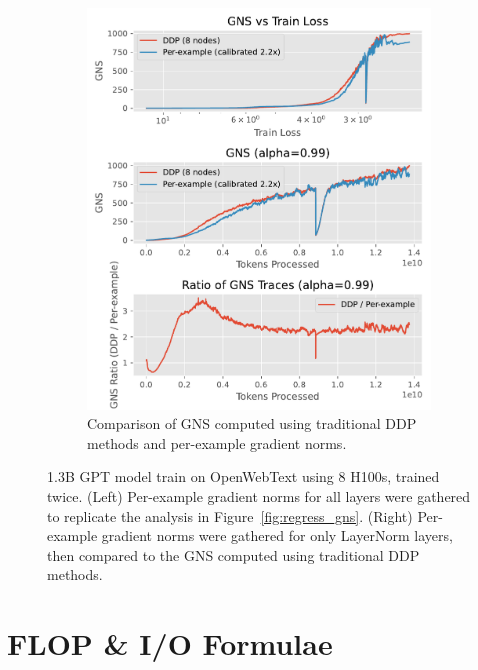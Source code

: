 \documentclass{article}
\begin{document}
\begin{figure}
\begin{subfigure}[b]{0.49\textwidth}
        \includegraphics[width=\linewidth]{neurips2024rebuttals/1p3B_ddp_vs_pe_gns.pdf}
        \caption{Comparison of GNS computed using traditional DDP methods and per-example gradient norms.}
        \label{fig:1p3b_right_subplot}
    \end{subfigure}
    \caption{%
          1.3B GPT model train on OpenWebText using 8 H100s, trained twice. (Left)
          Per-example gradient norms for all layers were gathered to replicate the analysis in Figure~\ref{fig:regress_gns}. (Right)
          Per-example gradient norms were gathered for only LayerNorm layers,
          then compared to the GNS computed using traditional DDP methods.}
    \label{fig:1p3b}
\end{figure}

\section{FLOP \& I/O Formulae}\label{app-flops}
\end{document}
